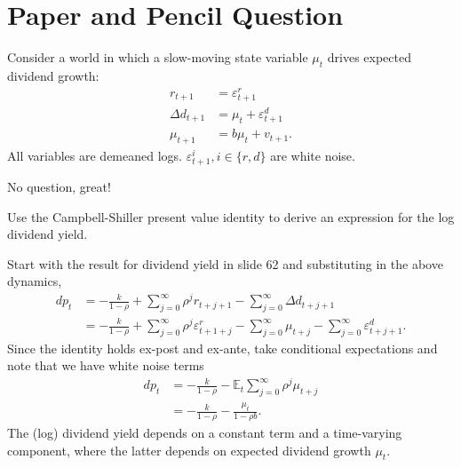 \section{Paper and Pencil Question}


\begin{answer}[Part a]
Consider a world in which a slow-moving state variable $\mu_t$ drives expected dividend growth:
\begin{align}
    r_{t+1} &= \varepsilon_{t+1}^r \label{eq:1a1} \\
    \Delta d_{t+1} &= \mu_t + \varepsilon_{t+1}^d \label {eq:1a2} \\
    \mu_{t+1} &= b \mu_t + v_{t+1}. \label{eq:1a3}
\end{align}
All variables are demeaned logs. $\varepsilon_{t+1}^i, i\in \{r,d\}$ are white noise.
\end{answer}
No question, great!

\begin{answer}[Part b]
Use the Campbell-Shiller present value identity to derive an expression for the log dividend yield.
\end{answer}
Start with the result for dividend yield in slide 62 and substituting in the above dynamics,
\begin{align}
    dp_t &= -\frac{k}{1-\rho} + \sum_{j=0}^\infty \rho^j r_{t+j+1} - \sum_{j=0}^\infty \Delta d_{t+j+1} \\
    &= -\frac{k}{1-\rho} + \sum_{j=0}^\infty \rho^j \varepsilon_{t+1+j}^r - \sum_{j=0}^\infty \mu_{t+j} - \sum_{j=0}^\infty \varepsilon_{t+j+1}^d.
\end{align}
Since the identity holds ex-post and ex-ante, take conditional expectations and note that we have white noise terms
\begin{align}
    dp_t &= -\frac{k}{1-\rho} - \mathbb{E}_t \sum_{j=0}^\infty \rho^j \mu_{t+j} \\
    &= -\frac{k}{1-\rho} - \frac{\mu_t}{1-\rho b}. \label{eq:dp}
\end{align}
The (log) dividend yield depends on a constant term and a time-varying component, where the latter depends on expected dividend growth $\mu_t$.

